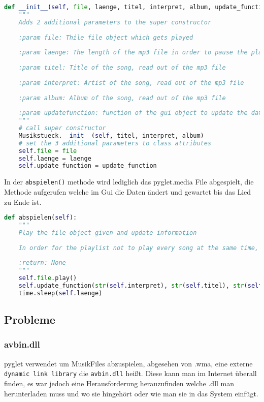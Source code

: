 \begin{lstlisting}[language=Python]
def __init__(self, file, laenge, titel, interpret, album, update_function):
    """
    Adds 2 additional parameters to the super constructor
    
    :param file: Thile file object which gets played
    
    :param laenge: The length of the mp3 file in order to pause the playlist for this amount
    
    :param titel: Title of the song, read out of the mp3 file
    
    :param interpret: Artist of the song, read out of the mp3 file
    
    :param album: Album of the song, read out of the mp3 file
    
    :param updatefunction: function of the gui object to update the data
    """
    # call super constructor
    Musikstueck.__init__(self, titel, interpret, album)
    # set the 3 additional parameters to class attributes
    self.file = file
    self.laenge = laenge
    self.update_function = update_function
\end{lstlisting}

In der \verb|abspielen()| methode wird lediglich das pyglet.media File abgespielt, die Methode aufgerufen welche im Gui die Daten ändert und gewartet bis das Lied zu Ende ist.

\begin{lstlisting}[language=Python]
def abspielen(self):
    """
    Play the file object given and update information
    
    In order for the playlist not to play every song at the same time, everytime a song is played, time.sleep for the length of the song
    
    :return: None
    """
    self.file.play()
    self.update_function(str(self.interpret), str(self.titel), str(self.album))
    time.sleep(self.laenge)
\end{lstlisting}


\subsection{Probleme}
\subsubsection{avbin.dll}
pyglet verwendet um MusikFiles abzuspielen, abgesehen von .wma, eine externe \verb|dynamic link library| die \verb|avbin.dll| heißt. Diese kann man im Internet überall finden, es war jedoch eine Herausforderung herauzufinden welche .dll man herunterladen muss und wo sie hingehört oder wie man sie in das System einfügt. 

